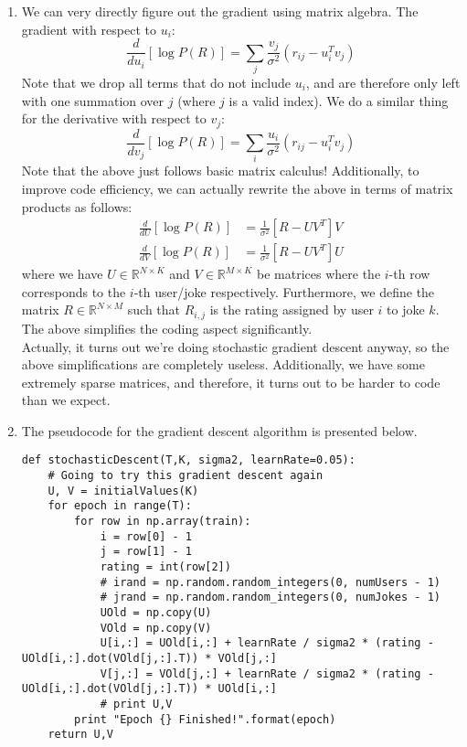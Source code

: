 \documentclass{harvardml}
\theoremstyle{plain}
\begin{document}
\begin{enumerate}[label=(\alph*)]
\item We can very directly figure out the gradient using matrix algebra. The gradient with respect to $u_i$:
$$
\frac{d}{d u_i} [ \log P(R)] = \sum_{j} \frac{v_j}{\sigma^2}(r_{ij} - u_i^Tv_j)
$$
Note that we drop all terms that do not include $u_i$, and are therefore only left with one summation over $j$ (where $j$ is a valid index). We do a similar thing for the derivative with respect to $v_j$:
$$
\frac{d}{d v_j} [ \log P(R)] = \sum_{i} \frac{u_i}{\sigma^2}(r_{ij} - u_i^Tv_j)
$$
Note that the above just follows basic matrix calculus! Additionally, to improve code efficiency, we can actually rewrite the above in terms of matrix products as follows:
\begin{align*}
\frac{d}{d U} [\log P(R)] &= \frac{1}{\sigma^2}[R - UV^T]V \\
\frac{d}{d V} [\log P(R)] &= \frac{1}{\sigma^2}[R - UV^T]U
\end{align*}
where we have $U \in \mathbb{R}^{N\times K}$ and $V \in \mathbb{R}^{M \times K}$ be matrices where the $i$-th row corresponds to the $i$-th user/joke respectively. Furthermore, we define the matrix $R \in \mathbb{R}^{N \times M}$ such that $R_{i,j}$ is the rating assigned by user $i$ to joke $k$. The above simplifies the coding aspect significantly.\\

Actually, it turns out we're doing stochastic gradient descent anyway, so the above simplifications are completely useless. Additionally, we have some extremely sparse matrices, and therefore, it turns out to be harder to code than we expect.

\item
The pseudocode for the gradient descent algorithm is presented below.

\begin{verbatim}
def stochasticDescent(T,K, sigma2, learnRate=0.05):
    # Going to try this gradient descent again
    U, V = initialValues(K)
    for epoch in range(T):
        for row in np.array(train):
            i = row[0] - 1
            j = row[1] - 1
            rating = int(row[2])
            # irand = np.random.random_integers(0, numUsers - 1)
            # jrand = np.random.random_integers(0, numJokes - 1)
            UOld = np.copy(U)
            VOld = np.copy(V)
            U[i,:] = UOld[i,:] + learnRate / sigma2 * (rating - UOld[i,:].dot(VOld[j,:].T)) * VOld[j,:]
            V[j,:] = VOld[j,:] + learnRate / sigma2 * (rating - UOld[i,:].dot(VOld[j,:].T)) * UOld[i,:]
            # print U,V
        print "Epoch {} Finished!".format(epoch)
    return U,V
\end{verbatim}


\end{enumerate}
\end{document}
